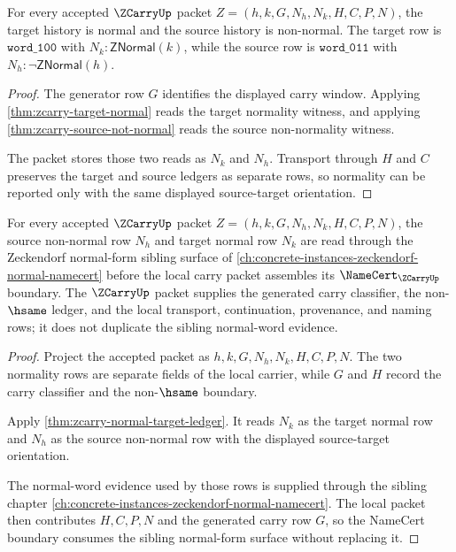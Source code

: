 \begin{theorem}
\label{thm:zcarry-normal-target-ledger}
For every accepted $\ZCarryUp$ packet $Z=(h,k,G,N_h,N_k,H,C,P,N)$, the target
history is normal and the source history is non-normal. The target row is
$\mathtt{word\_100}$ with $N_k:\mathsf{ZNormal}(k)$, while the source row is
$\mathtt{word\_011}$ with $N_h:\neg\mathsf{ZNormal}(h)$.
\end{theorem}
\begin{proof}
The generator row $G$ identifies the displayed carry window. Applying
\autoref{thm:zcarry-target-normal} reads the target normality witness, and
applying \autoref{thm:zcarry-source-not-normal} reads the source non-normality
witness.

The packet stores those two reads as $N_k$ and $N_h$. Transport through $H$ and
$C$ preserves the target and source ledgers as separate rows, so normality can be
reported only with the same displayed source-target orientation.
\end{proof}

\begin{theorem}
\label{thm:zcarry-zeckendorf-normal-sibling-dependency}
For every accepted $\ZCarryUp$ packet $Z=(h,k,G,N_h,N_k,H,C,P,N)$, the source non-normal row $N_h$ and target normal row $N_k$ are read through the Zeckendorf normal-form sibling surface of \autoref{ch:concrete-instances-zeckendorf-normal-namecert} before the local carry packet assembles its $\NameCert_{\ZCarryUp}$ boundary. The $\ZCarryUp$ packet supplies the generated carry classifier, the non-$\hsame$ ledger, and the local transport, continuation, provenance, and naming rows; it does not duplicate the sibling normal-word evidence.
\end{theorem}
\begin{proof}
Project the accepted packet as $h,k,G,N_h,N_k,H,C,P,N$. The two normality rows are separate fields of the local carrier, while $G$ and $H$ record the carry classifier and the non-$\hsame$ boundary.

Apply \autoref{thm:zcarry-normal-target-ledger}. It reads $N_k$ as the target normal row and $N_h$ as the source non-normal row with the displayed source-target orientation.

The normal-word evidence used by those rows is supplied through the sibling chapter \autoref{ch:concrete-instances-zeckendorf-normal-namecert}. The local packet then contributes $H,C,P,N$ and the generated carry row $G$, so the NameCert boundary consumes the sibling normal-form surface without replacing it.
\end{proof}

